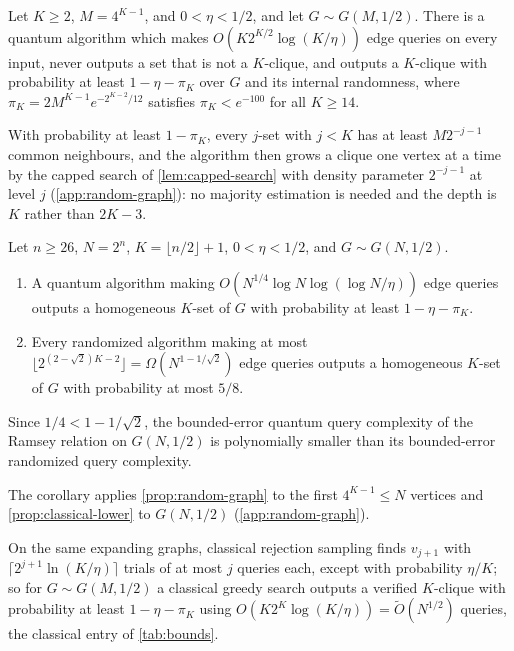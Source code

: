 \begin{proposition}
\label{prop:random-graph}
Let $K\ge2$, $M=4^{K-1}$, and $0<\eta<1/2$, and let $G\sim G(M,1/2)$.
There is a quantum algorithm which makes $O(K2^{K/2}\log(K/\eta))$ edge
queries on every input, never outputs a set that is not a $K$-clique, and
outputs a $K$-clique with probability at least $1-\eta-\pi_K$ over $G$ and
its internal randomness, where $\pi_K=2M^{K-1}e^{-2^{K-2}/12}$ satisfies
$\pi_K<e^{-100}$ for all $K\ge14$.
\end{proposition}

With probability at least $1-\pi_K$, every $j$-set with $j<K$ has at least
$M2^{-j-1}$ common neighbours, and the algorithm then grows a clique one
vertex at a time by the capped search of \cref{lem:capped-search} with
density parameter $2^{-j-1}$ at level $j$ (\cref{app:random-graph}): no
majority estimation is needed and the depth is $K$ rather than $2K-3$.

\begin{corollary}
\label{cor:separation}
Let $n\ge26$, $N=2^n$, $K=\lfloor n/2\rfloor+1$, $0<\eta<1/2$, and
$G\sim G(N,1/2)$.
\begin{enumerate}
\item A quantum algorithm making
$O(N^{1/4}\log N\log(\log N/\eta))$ edge queries outputs a homogeneous
$K$-set of $G$ with probability at least $1-\eta-\pi_K$.
\item Every randomized algorithm making at most
$\lfloor2^{(2-\sqrt2)K-2}\rfloor=\Omega(N^{1-1/\sqrt2})$ edge queries
outputs a homogeneous $K$-set of $G$ with probability at most $5/8$.
\end{enumerate}
Since $1/4<1-1/\sqrt2$, the bounded-error quantum query complexity of the
Ramsey relation on $G(N,1/2)$ is polynomially smaller than its bounded-error
randomized query complexity.
\end{corollary}

The corollary applies \cref{prop:random-graph} to the first $4^{K-1}\le N$
vertices and \cref{prop:classical-lower} to $G(N,1/2)$
(\cref{app:random-graph}).

\begin{remark}\label{rem:classical-greedy}
On the same expanding graphs, classical rejection sampling finds $v_{j+1}$
with $\lceil2^{j+1}\ln(K/\eta)\rceil$ trials of at most $j$ queries each,
except with probability $\eta/K$; so for $G\sim G(M,1/2)$ a classical
greedy search outputs a verified $K$-clique with probability at least
$1-\eta-\pi_K$ using $O(K2^K\log(K/\eta))=\widetilde O(N^{1/2})$ queries,
the classical entry of \cref{tab:bounds}.
\end{remark}

